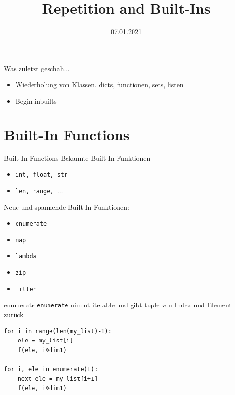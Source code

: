 



\title{Repetition and Built-Ins}
\date{07.01.2021}


	
\maketitle

\begin{frame}{Was zuletzt geschah...}
	\begin{itemize}
		\item Wiederholung von Klassen. dicts, functionen, sets, listen
		\item Begin inbuilts
	\end{itemize}
\end{frame}

\section{Built-In Functions}
\begin{frame}{Built-In Functions}
	Bekannte Built-In Funktionen
	\begin{itemize}
		\item \texttt{int, float, str}
		\item \texttt{len, range, $\dots$}
	\end{itemize}
	\pause
	Neue und spannende Built-In Funktionen:
	\begin{itemize}
		\item \texttt{enumerate}
		\item \texttt{map}
		\item \texttt{lambda}
		\item \texttt{zip}
		\item \texttt{filter}
	\end{itemize}
\end{frame}

\begin{frame}[fragile]{enumerate}
	\texttt{enumerate} nimmt iterable und gibt tuple von Index und Element zurück
	\begin{lstlisting}
for i in range(len(my_list)-1):
	ele = my_list[i]
	f(ele, i%dim1)

for i, ele in enumerate(L):
	next_ele = my_list[i+1]
	f(ele, i%dim1)
	\end{lstlisting}
\end{frame}

